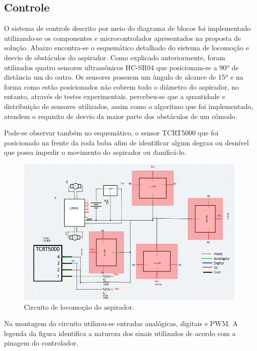 	

	\subsection{Controle} %
	\label{sub:controle2}
		O sistema de controle descrito por meio do diagrama de blocos foi implementado utilizando-se os componentes e microcontrolador apresentados na proposta de solução. Abaixo encontra-se o esquemático detalhado do sistema de locomoção e desvio de obstáculos do aspirador. Como explicado anteriormente, foram utilizados quatro sensores ultrassônicos HC-SR04 que posicionam-se a 90º de distância um do outro. Os sensores possuem um ângulo de alcance de 15º e na forma como estão posicionados não cobrem todo o diâmetro do aspirador, no entanto, através de testes experimentais, percebeu-se que a quantidade e distribuição de sensores utilizados, assim como o algoritmo que foi implementado, atendem o requisito de desvio da maior parte dos obstáculos de um cômodo.

		Pode-se observar também no esquemático, o sensor TCRT5000 que foi posicionado na frente da roda boba afim de identificar algum degrau ou desnível que possa impedir o movimento do aspirador ou danificá-lo.

		\begin{figure}[H]
			\centering
			\includegraphics[scale=0.7]{figuras/locomocao1.png}
			\caption{Circuito de locomoção do aspirador.}
			\label{img:circuito_de_locmoção}
		\end{figure}

		Na montagem do circuito utilizou-se entradas analógicas, digitais e PWM. A legenda da figura identifica a natureza dos sinais utilizados de acordo com a pinagem do controlador.


